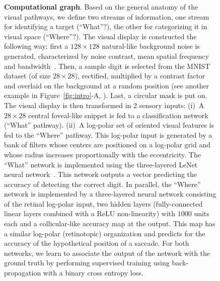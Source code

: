 \begin{figure}[t!]%
	\caption{%
		{\bf Computational graph}. Based on the general anatomy of the visual pathways, we define two streams of information, one stream for identifying a target (``What''?), the other for categorizing it in visual space (``Where''?).
		\A The visual display is constructed the following way: first a $128\times 128$ natural-like background noise is generated, characterized by noise contrast, mean spatial frequency and bandwidth~\cite{Sanz12}. Then, a sample digit is selected from the MNIST dataset (of size $28\times 28$), rectified, multiplied by a contrast factor and overlaid on the background at a random position (see another example in Figure~\ref{fig:intro}-A, \DIS ). Last, a circular mask is put on. %
		\B The visual display is then transformed in 2 sensory inputs: (i)~A $28\times 28$ central foveal-like snippet is fed to a classification network (``What'' pathway). (ii)~A log-polar set of oriented visual features is fed to the ``Where'' pathway. This log-polar input is generated by a bank of filters whose centers are positioned on a log-polar grid and whose radius increases proportionally with the eccentricity. %
		\C The ``What'' network is implemented using the three-layered LeNet neural network~\cite{Lecun1998}. This network outputs a vector predicting the accuracy of detecting the correct digit. In parallel, the ``Where'' network is implemented by a three-layered neural network consisting of the retinal log-polar input, two hidden layers (fully-connected linear layers combined with a ReLU non-linearity) with $1000$ units each and a collicular-like accuracy map at the output. This map has a similar log-polar (retinotopic) organization and predicts for the accuracy of the hypothetical position of a saccade. For both networks, we learn to associate the output of the network with the ground truth by performing supervised training using back-propagation with a binary cross entropy loss.
}
\end{figure}
